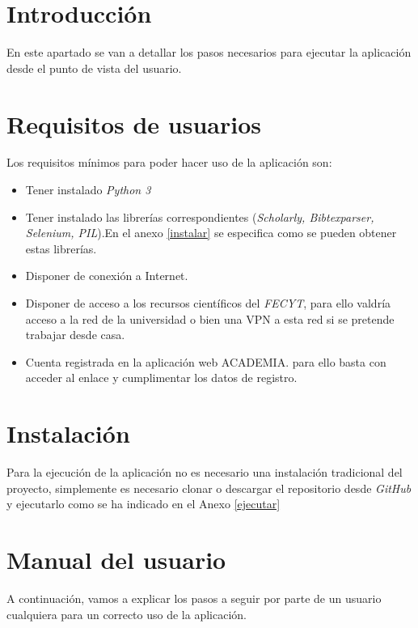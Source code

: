 \section{Introducción}
En este apartado se van a detallar los pasos necesarios para ejecutar la aplicación desde el punto de vista del usuario.
\section{Requisitos de usuarios}
Los requisitos mínimos para poder hacer uso de la aplicación son:
\begin{itemize}
	\item Tener instalado \emph{Python 3}
	\item Tener instalado las librerías correspondientes (\emph{Scholarly, Bibtexparser, Selenium, PIL}).En el anexo \ref{instalar} se especifica como se pueden obtener estas librerías.
	\item Disponer de conexión a Internet.
	\item Disponer de acceso a los recursos científicos del \emph{FECYT}, para ello valdría acceso a la red de la universidad o bien una VPN a esta red si se pretende trabajar desde casa.
	\item Cuenta registrada en la aplicación web ACADEMIA. para ello basta con acceder al enlace \cite{registro} y cumplimentar los datos de registro.
\end{itemize}
\section{Instalación}
Para la ejecución de la aplicación no es necesario una instalación tradicional del proyecto, simplemente es necesario clonar o descargar el repositorio desde \emph{GitHub} y ejecutarlo como se ha indicado en el Anexo \ref{ejecutar}
\section{Manual del usuario}
A continuación, vamos a explicar los pasos a seguir por parte de un usuario cualquiera para un correcto uso de la aplicación.

